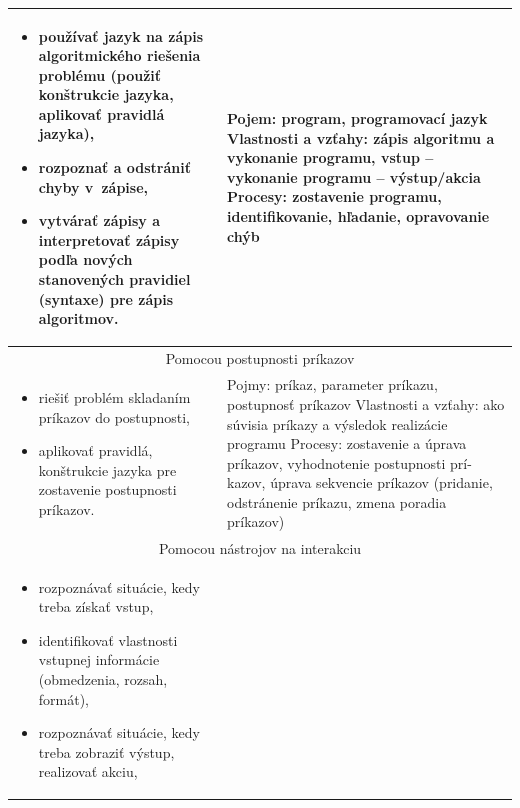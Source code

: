 \documentclass[FP,DP]{tulthesis}
\begin{document}
{{{{\begin{table}[t]
\begin{tabular}{|l|l|}
\begin{minipage}[t]{0.45\textwidth}
\begin{itemize}[leftmargin=*,nosep]
  	\item používať jazyk na zápis algoritmického riešenia problému (použiť
konštrukcie jazyka, aplikovať pravidlá jazyka), 
	\item rozpoznať a odstrániť chyby v~zápise,
	\item vytvárať zápisy a interpretovať zápisy podľa nových stanovených
pravidiel (syntaxe) pre zápis algoritmov.
\end{itemize}
  \end{minipage} &
  \begin{minipage}[t]{0.45\textwidth}
Pojem: program, programovací jazyk
Vlastnosti a vzťahy: zápis algoritmu a vykonanie programu, vstup –
vykonanie programu – výstup/akcia
Procesy: zostavenie programu, identifikovanie, hľadanie, opravovanie
chýb
  \end{minipage}\\\hline
\multicolumn{2}{|c|}{Pomocou postupnosti príkazov}\\\hline
\begin{minipage}[t]{0.45\textwidth}
\begin{itemize}[leftmargin=*,nosep]
  	\item riešiť problém skladaním príkazov do postupnosti,
	\item aplikovať pravidlá, konštrukcie jazyka pre zostavenie postupnosti príkazov.
\end{itemize}
  \end{minipage} &
  \begin{minipage}[t]{0.45\textwidth}
Pojmy: príkaz, parameter príkazu, postupnosť príkazov
Vlastnosti a vzťahy: ako súvisia príkazy a výsledok realizácie programu
Procesy: zostavenie a úprava príkazov, vyhodnotenie postupnosti prí-
kazov, úprava sekvencie príkazov (pridanie, odstránenie príkazu, zmena
poradia príkazov)
  \end{minipage}\\\hline
\multicolumn{2}{|c|}{Pomocou nástrojov na interakciu}\\\hline
\begin{minipage}[t]{0.45\textwidth}
\begin{itemize}[leftmargin=*,nosep]
  	\item rozpoznávať situácie, kedy treba získať vstup,
	\item identifikovať vlastnosti vstupnej informácie (obmedzenia, rozsah,
formát),
\item rozpoznávať situácie, kedy treba zobraziť výstup, realizovať akciu,


\end{itemize}
\end{minipage}
\end{tabular}
\end{table}}}}}
\end{document}
